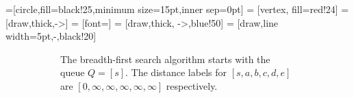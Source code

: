 
  =[circle,fill=black!25,minimum size=15pt,inner sep=0pt]
   = [vertex, fill=red!24]
   = [draw,thick,->]
   = [font=\small]
   = [draw,thick, ->,blue!50]
   = [draw,line width=5pt,-,black!20]

 \begin{figure}
   \begin{subfigure}[t]{0.45\textwidth}
 \caption{The breadth-first search algorithm starts with the queue
   $Q=[s]$.  The distance labels for $[s,a,b,c,d,e]$ are 
   $[0,\infty,\infty,\infty,\infty,\infty]$ respectively.}
\end{subfigure}
\hfill 
\begin{subfigure}[t]{0.45\textwidth}
\end{subfigure}
\end{figure}
